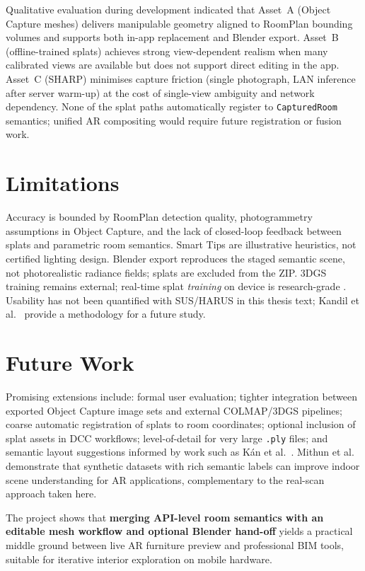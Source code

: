 Qualitative evaluation during development indicated that Asset~A (Object Capture meshes) delivers manipulable geometry aligned to RoomPlan bounding volumes and supports both in-app replacement and Blender export. Asset~B (offline-trained splats) achieves strong view-dependent realism when many calibrated views are available but does not support direct editing in the app. Asset~C (SHARP) minimises capture friction (single photograph, LAN inference after server warm-up) at the cost of single-view ambiguity and network dependency. None of the splat paths automatically register to \texttt{CapturedRoom} semantics; unified AR compositing would require future registration or fusion work.

\section{Limitations}

Accuracy is bounded by RoomPlan detection quality, photogrammetry assumptions in Object Capture, and the lack of closed-loop feedback between splats and parametric room semantics. Smart Tips are illustrative heuristics, not certified lighting design. Blender export reproduces the staged semantic scene, not photorealistic radiance fields; splats are excluded from the ZIP. 3DGS training remains external; real-time splat \emph{training} on device is research-grade \cite{Guo26}. Usability has not been quantified with SUS/HARUS in this thesis text; Kandil et al.\ \cite{kandil2021ux} provide a methodology for a future study.

\section{Future Work}

Promising extensions include: formal user evaluation; tighter integration between exported Object Capture image sets and external COLMAP/3DGS pipelines; coarse automatic registration of splats to room coordinates; optional inclusion of splat assets in DCC workflows; level-of-detail for very large \texttt{.ply} files; and semantic layout suggestions informed by work such as K\'an et al.\ \cite{kan2021ar}. Mithun et al.\ \cite{Geo2023} demonstrate that synthetic datasets with rich semantic labels can improve indoor scene understanding for AR applications, complementary to the real-scan approach taken here.

The project shows that \textbf{merging API-level room semantics with an editable mesh workflow and optional Blender hand-off} yields a practical middle ground between live AR furniture preview and professional BIM tools, suitable for iterative interior exploration on mobile hardware.
